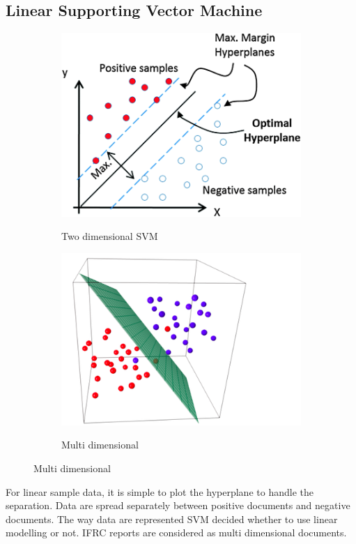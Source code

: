 \subsection{Linear Supporting Vector Machine }
\newpage
\begin{figure}
        \begin{subfigure}{.6\textwidth}
         \includegraphics[scale=.3]    	          {images/linear.png} \label{linear}
         \caption{Two dimensional SVM}
        \end{subfigure}%
        \begin{subfigure}{\textwidth}
                \includegraphics[scale=.6]    	                 {images/multi.png}
                \label{multi}
                \caption{Multi dimensional  }
        \end{subfigure}

\end{figure}
For linear sample data, it is simple to plot the hyperplane to handle the separation.  Data are spread separately between positive documents and negative documents. The way data are represented SVM decided  whether to use linear modelling or not. IFRC reports are considered as multi dimensional documents.

